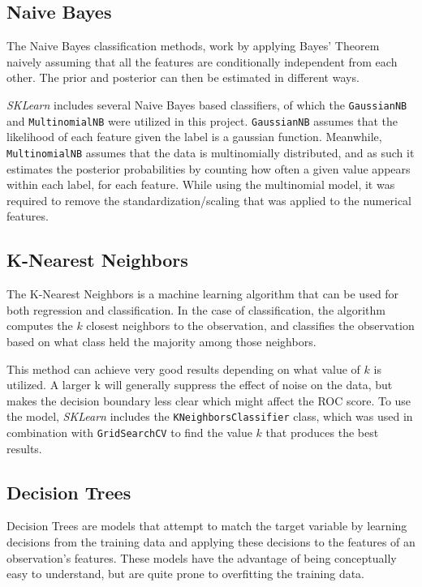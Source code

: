 \documentclass{IEEEtran}
\begin{document}
\subsection{Naive Bayes}

The Naive Bayes classification methods, work by applying Bayes' Theorem naively assuming that all the features are conditionally independent from each other. The prior and posterior can then be estimated in different ways.

\textit{SKLearn} includes several Naive Bayes based classifiers, of which the \texttt{GaussianNB} and \texttt{MultinomialNB} were utilized in this project. \texttt{GaussianNB} assumes that the likelihood of each feature given the label is a gaussian function. Meanwhile, \texttt{MultinomialNB} assumes that the data is multinomially distributed, and as such it estimates the posterior probabilities by counting how often a given value appears within each label, for each feature. While using the multinomial model, it was required to remove the standardization/scaling that was applied to the numerical features.

\subsection{K-Nearest Neighbors}

The K-Nearest Neighbors is a machine learning algorithm that can be used for both regression and classification. In the case of classification, the algorithm computes the $k$ closest neighbors to the observation, and classifies the observation based on what class held the majority among those neighbors.

This method can achieve very good results depending on what value of $k$ is utilized. A larger k will generally suppress the effect of noise on the data, but makes the decision boundary less clear which might affect the ROC score. To use the model, \textit{SKLearn} includes the \texttt{KNeighborsClassifier} class, which was used in combination with \texttt{GridSearchCV} to find the value $k$ that produces the best results.

\subsection{Decision Trees}

Decision Trees are models that attempt to match the target variable by learning decisions from the training data and applying these decisions to the features of an observation's features. These models have the advantage of being conceptually easy to understand, but are quite prone to overfitting the training data.
\end{document}
